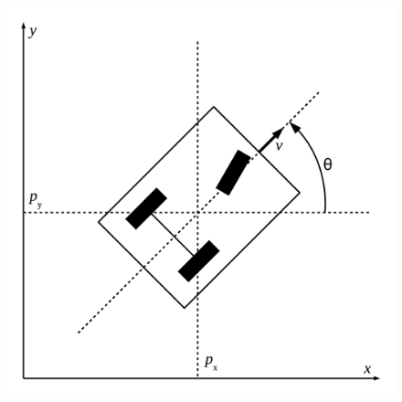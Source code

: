 \documentclass{beamer}
\renewcommand{\(}{\left(}
\renewcommand{\)}{\right)}
\renewcommand{\[}{\left[}
\renewcommand{\]}{\right]}
\begin{document}
\begin{frame}
\begin{minipage}{.70\textwidth}
	\end{minipage}%
	\begin{minipage}{.3\textwidth}
	\begin{figure}
		\centering
		\includegraphics[width=1\textwidth]{images/Nonholomonic-robot.pdf}
	\end{figure}
\end{minipage}



\end{frame}

\end{document}
